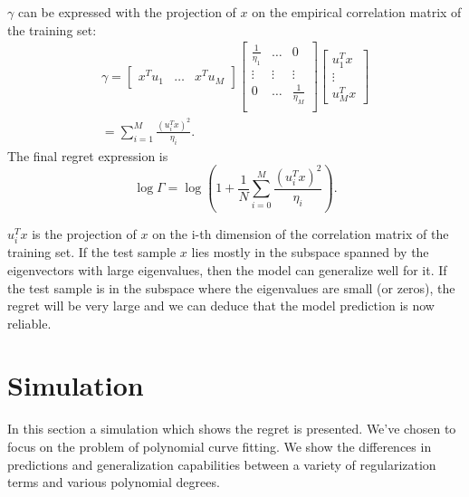 \documentclass[conference,letterpaper]{IEEEtran}
\begin{document}
$\gamma$ can be expressed with the projection of $x$ on the empirical correlation matrix of the training set:
\begin{multline}
\gamma = 
\begin{bmatrix}
x^T u_1 & \hdots & x^T u_M
\end{bmatrix}
\begin{bmatrix}
\frac{1}{\eta_1} & \hdots & 0 \\
\vdots & \vdots &  \vdots \\
0 & \hdots &  \frac{1}{\eta_M} \\
\end{bmatrix}
\begin{bmatrix}
u_1^T x \\ \vdots \\ u_M^T x
\end{bmatrix} \\
= \sum_{i=1}^{M} \frac{\left(u_i^T x\right)^2}{\eta_i}.
\end{multline}
The final regret expression is
\begin{equation}
\log \Gamma = \log \left(1 + \frac{1}{N} \sum_{i=0}^{M} \frac{\left(u_i^T x\right)^2 }{\eta_i}\right).
\end{equation}

$u_i^T x$ is the projection of $x$ on the i-th dimension of the correlation matrix of the training set. If the test sample $x$ lies mostly in the subspace spanned by the eigenvectors with large eigenvalues, then the model can generalize well for it. If the test sample is in the subspace where the eigenvalues are small (or zeros), the regret will be very large and we can deduce that the model prediction is now reliable.

\section{Simulation} \label{sec:simulation}
In this section a  simulation which shows the regret is presented.
We've chosen to focus on the problem of polynomial curve fitting. 
We show the differences in predictions and generalization capabilities between a variety of regularization terms and various polynomial degrees.
\end{document}
